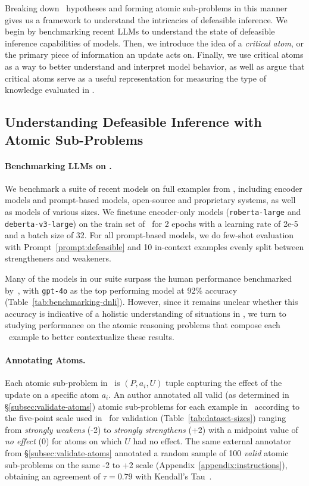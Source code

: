 Breaking down \dsnli~hypotheses and forming atomic sub-problems in this manner gives us a framework to understand the intricacies of defeasible inference.
%
We begin by benchmarking recent LLMs to understand the state of defeasible inference capabilities of models.
%
Then, we introduce the idea of a \textit{critical atom}, or the primary piece of information an update acts on.
%
Finally, we use critical atoms as a way to better understand and interpret model behavior, as well as argue that critical atoms serve as a useful representation for measuring the type of knowledge evaluated in \dsnli.

\subsection{Understanding Defeasible Inference with Atomic Sub-Problems}

\paragraph{Benchmarking LLMs on \dnli.} We benchmark a suite of recent models on full examples from \dsnlitest, including encoder models and prompt-based models, open-source and proprietary systems, as well as models of various sizes. 
%
We finetune encoder-only models (\texttt{roberta-large} and \texttt{deberta-v3-large}) on the train set of \dsnli~for 2 epochs with a learning rate of 2e-5 and a batch size of 32.
%
For all prompt-based models, we do few-shot evaluation with Prompt~\ref{prompt:defeasible} and 10 in-context examples evenly split between strengtheners and weakeners.

Many of the models in our suite surpass the human performance benchmarked by~\citet{rudinger-etal-2020-thinking}, with \texttt{gpt-4o} as the top performing model at 92\% accuracy (Table~\ref{tab:benchmarking-dnli}).
%
However, since it remains unclear whether this accuracy is indicative of a holistic understanding of situations in \dsnli, we turn to studying performance on the atomic reasoning problems that compose each \dsnli~example to better contextualize these results.
%
\paragraph{Annotating Atoms.} Each atomic sub-problem in \dsnli~is $(P, a_i, U)$ tuple capturing the effect of the update on a specific atom $a_i$. 
%
An author annotated all valid (as determined in \S\ref{subsec:validate-atoms}) atomic sub-problems for each example in \dsnlitest~according to the five-point scale used in~\citet{rudinger-etal-2020-thinking} for validation (Table~\ref{tab:dataset-sizes}) ranging from \textit{strongly weakens} (-2) to \textit{strongly strengthens} (+2)  with a midpoint value of \textit{no effect} (0) for atoms on which $U$ had no effect. 
%
The same external annotator from \S\ref{subsec:validate-atoms} annotated a random sample of 100 \textit{valid} atomic sub-problems on the same -2 to +2 scale (Appendix~\ref{appendix:instructions}), obtaining an agreement of $\tau=0.79$ with Kendall's Tau~\cite{kendall1938new}.


